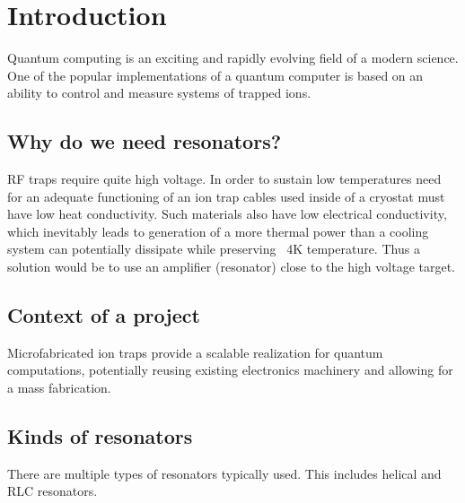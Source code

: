 \newcommand{\package}{\emph}

\chapter{Introduction}

Quantum computing is an exciting and rapidly evolving field of a modern science. One of the popular implementations of a quantum computer is based on an ability to control and measure systems of trapped ions.
\section{Why do we need resonators?}
\label{sec:why_resonators}

RF traps require quite high voltage. In order to sustain low temperatures need for an adequate functioning of an ion trap cables used inside of a cryostat must have low heat conductivity. Such materials also have low electrical conductivity, which inevitably leads to generation of a more thermal power than a cooling system can potentially dissipate while preserving ~4K temperature. Thus a solution would be to use an amplifier (resonator) close to the high voltage target.

\section{Context of a project}
\label{sec:context}

Microfabricated ion traps provide a scalable realization for quantum computations, potentially reusing existing electronics machinery and allowing for a mass fabrication.

\section{Kinds of resonators}
\label{sec:kinds_resonators}

There are multiple types of resonators typically used. This includes helical and RLC resonators.